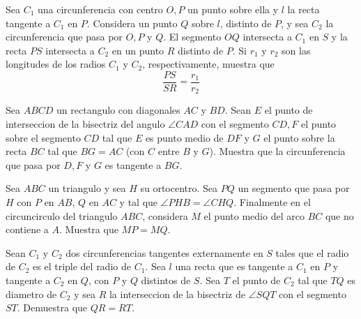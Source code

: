 \documentclass[11pt]{scrartcl}
\begin{document}
\begin{problem}
[2012/1] Sea $C_1$ una circunferencia con centro $O, P$ un punto sobre ella y $l$ la recta tangente a $C_1$ en $P$. Considera un punto $Q$ sobre $l$, distinto de $P$, y sea $C_2$ la circunferencia que pasa por $O, P$ y $Q$. El segmento $OQ$ intersecta a $C_1$ en $S$ y la recta $PS$ intersecta a $C_2$ en un punto $R$ distinto de $P$. Si $r_1$ y $r_2$ son las longitudes de los radios $C_1$ y $C_2$, respectivamente, muestra que 
$$\frac{PS}{SR}=\frac{r_1}{r_2}$$
\end{problem}

\begin{problem}
[2014/4] Sea $ABCD$ un rectangulo con diagonales $AC$ y $BD$. Sean $E$ el punto de interseccion de la bisectriz del angulo $\angle{CAD}$ con el segmento $CD, F$ el punto sobre el segmento $CD$ tal que $E$ es punto medio de $DF$ y $G$ el punto sobre la recta $BC$ tal que $BG=AC$ (con $C$ entre $B$ y $G$). Muestra que la circunferencia que pasa por $D,F$ y $G$ es tangente a $BG$.
\end{problem}

\begin{problem}
[2015/1] Sea $ABC$ un triangulo y sea $H$ su ortocentro. Sea $PQ$ un segmento que pasa por $H$ con $P$ en $AB$, $Q$ en $AC$ y tal que $\angle{PHB}=\angle{CHQ}$. Finalmente en el circuncirculo del triangulo $ABC$, considera $M$ el punto medio del arco $BC$ que no contiene a $A$. Muestra que $MP=MQ$.
\end{problem}

\begin{problem}
[2016/1] Sean $C_1$ y $C_2$ dos circunferencias tangentes externamente en $S$ tales que el radio de $C_2$ es el triple del radio de $C_1$. Sea $l$ una recta que es tangente a $C_1$ en $P$ y tangente a $C_2$ en $Q$, con $P$ y $Q$ distintos de $S$. Sea $T$ el punto de $C_2$ tal que $TQ$ es diametro de $C_2$ y sea $R$ la interseccion de la bisectriz de $\angle{SQT}$ con el segmento $ST$. Demuestra que $QR=RT$.
\end{problem}
\end{document}

